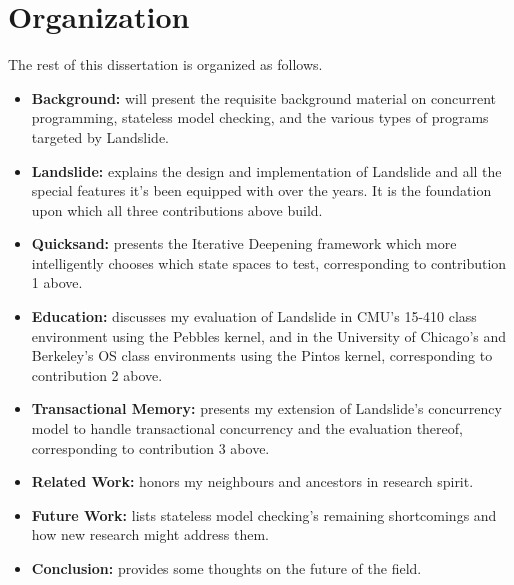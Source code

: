 \section{Organization}

The rest of this dissertation is organized as follows.

\begin{itemize}
	\item {\bf Background:}  will present the requisite background material on concurrent programming, stateless model checking, and the various types of programs targeted by Landslide.
	\item {\bf Landslide:}  explains the design and implementation of Landslide
		and all the special features it's been equipped with over the years.
		It is the foundation upon which all three contributions above build.
	\item {\bf Quicksand:}  presents the Iterative Deepening framework which more intelligently chooses which state spaces to test, corresponding to contribution 1 above.
	\item {\bf Education:}  discusses my evaluation of Landslide
		in CMU's 15-410 class environment using the Pebbles kernel,
		and in the University of Chicago's and Berkeley's OS class environments using the Pintos kernel,
		corresponding to contribution 2 above.
	\item {\bf Transactional Memory:}  presents my extension of Landslide's concurrency model to handle transactional concurrency and the evaluation thereof, corresponding to contribution 3 above.
	\item {\bf Related Work:}  honors my neighbours and ancestors in research spirit.
	\item {\bf Future Work:}  lists stateless model checking's remaining shortcomings and how new research might address them.
	\item {\bf Conclusion:}  provides some thoughts on the future of the field.
\end{itemize}

